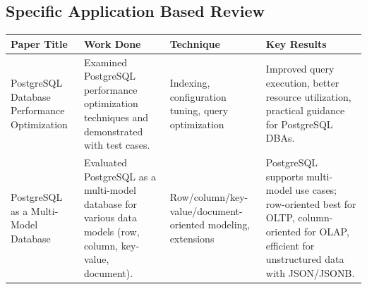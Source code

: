 \documentclass[conference]{IEEEtran}
\begin{document}
\subsection{Specific Application Based Review}
\begin{table}[htbp]
\centering
\small
\begin{tabular}{|p{1.7cm}|p{1.9cm}|p{2.1cm}|p{1.9cm}|}
\hline
\textbf{Paper Title} & \textbf{Work Done} & \textbf{Technique} & \textbf{Key Results} \\
\hline
PostgreSQL Database Performance Optimization\cite{b6} & Examined PostgreSQL performance optimization techniques and demonstrated with test cases. & Indexing, configuration tuning, query optimization & Improved query execution, better resource utilization, practical guidance for PostgreSQL DBAs. \\
\hline
PostgreSQL as a Multi-Model Database\cite{b7} & Evaluated PostgreSQL as a multi-model database for various data models (row, column, key-value, document). & Row/column/key-value/document-oriented modeling, extensions & PostgreSQL supports multi-model use cases; row-oriented best for OLTP, column-oriented for OLAP, efficient for unstructured data with JSON/JSONB. \\
\hline
\end{tabular}
\end{table}
\end{document}
